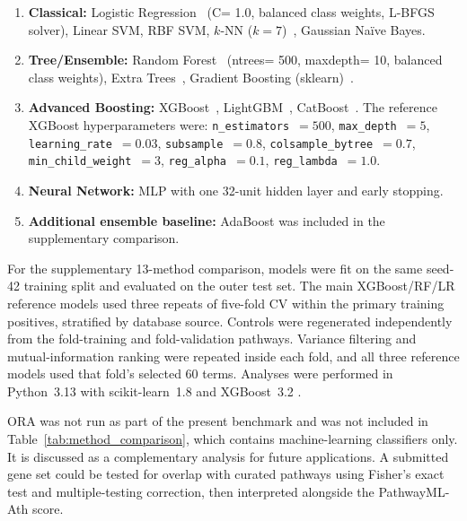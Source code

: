 \documentclass[12pt,twoside]{article}
\begin{document}
\begin{enumerate}[leftmargin=1.5em,label=\arabic*.]
\item \textbf{Classical:} Logistic Regression~\citep{pedregosa2011scikit} (C= 1.0, balanced class weights, L-BFGS solver),
Linear SVM, RBF SVM, $k$-NN ($k=7$)~\citep{cover1967nearest}, Gaussian Na\"{i}ve Bayes.
\item \textbf{Tree/Ensemble:} Random Forest~\citep{breiman2001random} (ntrees= 500, maxdepth= 10, balanced class weights),
Extra Trees~\citep{geurts2006extremely},
Gradient Boosting (sklearn)~\citep{friedman2001greedy}.
\item \textbf{Advanced Boosting:} XGBoost~\citep{chen2016xgboost},
LightGBM~\citep{ke2017lightgbm}, CatBoost~\citep{prokhorenkova2018catboost}. The reference XGBoost hyperparameters were:
\texttt{n\_estimators}~$= 500$, \texttt{max\_depth}~$= 5$,
\texttt{learning\_rate}~$= 0.03$, \texttt{subsample}~$= 0.8$,
\texttt{colsample\_bytree}~$= 0.7$, \texttt{min\_child\_weight}~$= 3$,
\texttt{reg\_alpha}~$= 0.1$, \texttt{reg\_lambda}~$= 1.0$.

\item \textbf{Neural Network:} MLP with one 32-unit hidden layer and early stopping.
\item \textbf{Additional ensemble baseline:} AdaBoost was included in the supplementary comparison.
\end{enumerate}

For the supplementary 13-method comparison, models were fit on the same seed-42 training split and evaluated on the outer test set. The main XGBoost/RF/LR reference models used three repeats of five-fold CV within the primary training positives, stratified by database source. Controls were regenerated independently from the fold-training and fold-validation pathways. Variance filtering and mutual-information ranking were repeated inside each fold, and all three reference models used that fold's selected 60 terms. Analyses were performed in Python~3.13 with scikit-learn~1.8 \citep{pedregosa2011scikit} and XGBoost~3.2 \citep{chen2016xgboost}.

ORA was not run as part of the present benchmark and was not included in Table~\ref{tab:method_comparison}, which contains machine-learning classifiers only. It is discussed as a complementary analysis for future applications. A submitted gene set could be tested for overlap with curated pathways using Fisher's exact test and multiple-testing correction, then interpreted alongside the PathwayML-Ath score.
\end{document}
